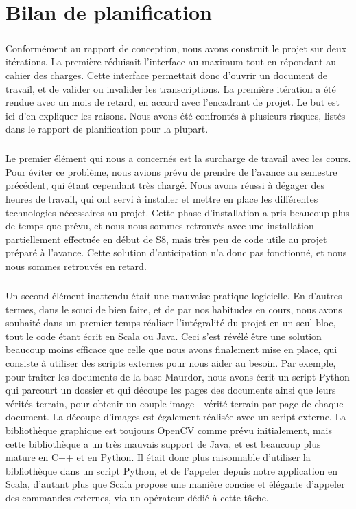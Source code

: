 \chapter{Bilan de planification}

\paragraph{}
Conformément au rapport de conception, nous avons construit le projet sur deux itérations. La première réduisait l'interface au maximum tout en répondant au cahier des charges. Cette interface permettait donc d'ouvrir un document de travail, et de valider ou invalider les transcriptions. La première itération a été rendue avec un mois de retard, en accord avec l'encadrant de projet. Le but est ici d'en expliquer les raisons. Nous avons été confrontés à plusieurs risques, listés dans le rapport de planification pour la plupart.

\paragraph{}
Le premier élément qui nous a concernés est la surcharge de travail avec les cours. Pour éviter ce problème, nous avions prévu de prendre de l'avance au semestre précédent, qui étant cependant très chargé. Nous avons réussi à dégager des heures de travail, qui ont servi à installer et mettre en place les différentes technologies nécessaires au projet. Cette phase d'installation a pris beaucoup plus de temps que prévu, et nous nous sommes retrouvés avec une installation partiellement effectuée en début de S8, mais très peu de code utile au projet préparé à l'avance. Cette solution d'anticipation n'a donc pas fonctionné, et nous nous sommes retrouvés en retard.

\paragraph{}
Un second élément inattendu était une mauvaise pratique logicielle. En d'autres termes, dans le souci de bien faire, et de par nos habitudes en cours, nous avons souhaité dans un premier temps réaliser l'intégralité du projet en un seul bloc, tout le code étant écrit en Scala ou Java. Ceci s'est révélé être une solution beaucoup moins efficace que celle que nous avons finalement mise en place, qui consiste à utiliser des scripts externes pour nous aider au besoin. Par exemple, pour traiter les documents de la base Maurdor, nous avons écrit un script Python qui parcourt un dossier et qui découpe les pages des documents ainsi que leurs vérités terrain, pour obtenir un couple image - vérité terrain par page de chaque document. La découpe d'images est également réalisée avec un script externe. La bibliothèque graphique est toujours OpenCV comme prévu initialement, mais cette bibliothèque a un très mauvais support de Java, et est beaucoup plus mature en C++ et en Python. Il était donc plus raisonnable d'utiliser la bibliothèque dans un script Python, et de l'appeler depuis notre application en Scala, d'autant plus que Scala propose une manière concise et élégante d'appeler des commandes externes, via un opérateur dédié à cette tâche.

